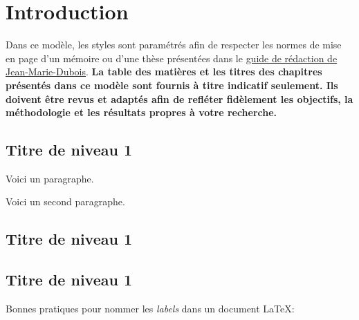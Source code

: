 \chapter{Introduction} \label{chap:introduction}

Dans ce modèle, les styles sont paramétrés afin de respecter les normes de mise en page d’un mémoire ou d'une thèse présentées dans le \href{https://www.usherbrooke.ca/geomatique/fileadmin/sites/geomatique/espace-etudiant/guide-redaction2004_vf.pdf}{guide de rédaction de Jean-Marie-Dubois}. \textcolor{eclipsepurple}{\textbf{La table des matières et les titres des chapitres présentés dans ce modèle sont fournis à titre indicatif seulement. Ils doivent être revus et adaptés afin de refléter fidèlement les objectifs, la méthodologie et les résultats propres à votre recherche.}}

\section{Titre de niveau 1} \label{sec:introduction-1}
Voici un paragraphe.

Voici un second paragraphe.

\lipsum[1-2] %

\section{Titre de niveau 1} \label{sec:introduction-2}

\lipsum[1] %

\section{Titre de niveau 1} \label{sec:introduction-3}

Bonnes pratiques pour nommer les \textit{labels} dans un document \LaTeX :

